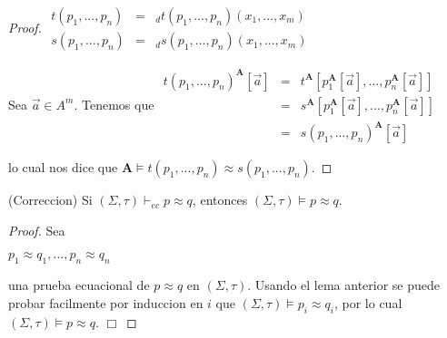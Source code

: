 \begin{proof}
    \(\displaystyle \begin{array}{rcl} t(p_{1},...,p_{n}) & =& _{d}t(p_{1},...,p_{n})(x_{1},...,x_{m}) \\ s(p_{1},...,p_{n}) & =& _{d}s(p_{1},...,p_{n})(x_{1},...,x_{m}) \end{array} \)

    Sea \(\vec{a}\in A^{m}\). Tenemos que
    \(\displaystyle \begin{array}{rcl} t(p_{1},...,p_{n})^{\mathbf{A}}\left[ \vec{a}\right] & = & t^{\mathbf{A}} \left[ p_{1}^{\mathbf{A}}\left[ \vec{a}\right] ,...,p_{n}^{\mathbf{A}}\left[ \vec{a}\right] \right] \\ & = & s^{\mathbf{A}}\left[ p_{1}^{\mathbf{A}}\left[ \vec{a}\right] ,...,p_{n}^{\mathbf{A}}\left[ \vec{a}\right] \right] \\ & = & s(p_{1},...,p_{n})^{\mathbf{A}}\left[ \vec{a}\right] \end{array} \)

    lo cual nos dice que \(\mathbf{A}\models t(p_{1},...,p_{n})\approx s(p_{1},...,p_{n})\).
  \end{proof}

  \begin{theorem}
    (Correccion) Si \((\Sigma ,\tau )\vdash _{ec}p\approx q\), entonces \((\Sigma ,\tau )\models p\approx q\).
  \end{theorem}
  \begin{proof}
    Sea

    \(\displaystyle p_{1}\approx q_{1},...,p_{n}\approx q_{n} \)

    una prueba ecuacional de \(p\approx q\) en \((\Sigma ,\tau ).\) Usando el lema anterior se puede probar facilmente por induccion en \(i\) que \((\Sigma ,\tau )\models p_{i}\approx q_{i}\), por lo cual \((\Sigma ,\tau )\models p\approx q. \) \(\Box\)
  \end{proof}


